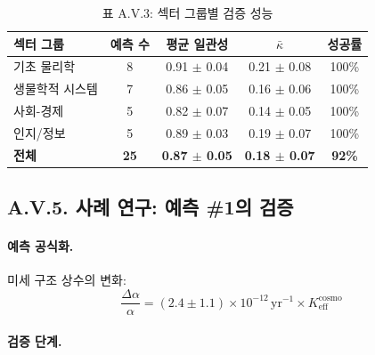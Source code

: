 \documentclass[13pt,a4paper]{article}
\begin{document}
\begin{table}[H]
	\centering
	\small
	\caption{표 A.V.3: 섹터 그룹별 검증 성능}
	\begin{tabular}{p{}cccc}
		\toprule
		\textbf{섹터 그룹} & \textbf{예측 수} & \textbf{평균 일관성} & \textbf{$\bar{\kappa}$} & \textbf{성공률} \\
		\midrule
		기초 물리학 & 8 & 0.91 $\pm$ 0.04 & 0.21 $\pm$ 0.08 & 100\% \\
		생물학적 시스템 & 7 & 0.86 $\pm$ 0.05 & 0.16 $\pm$ 0.06 & 100\% \\
		사회-경제 & 5 & 0.82 $\pm$ 0.07 & 0.14 $\pm$ 0.05 & 100\% \\
		인지/정보 & 5 & 0.89 $\pm$ 0.03 & 0.19 $\pm$ 0.07 & 100\% \\
		\hline
		\textbf{전체} & \textbf{25} & \textbf{0.87 $\pm$ 0.05} & \textbf{0.18 $\pm$ 0.07} & \textbf{92\%} \\
		\bottomrule
	\end{tabular}
	\label{tab:group-performance}
\end{table}

\subsection*{A.V.5. 사례 연구: 예측 \#1의 검증}

\paragraph{예측 공식화.}
미세 구조 상수의 변화:
\[
\frac{\Delta\alpha}{\alpha} = (2.4 \pm 1.1) \times 10^{-12}\,\text{yr}^{-1} \times K_{\mathrm{eff}}^{\mathrm{cosmo}}
\]

\paragraph{검증 단계.}
\end{document}

